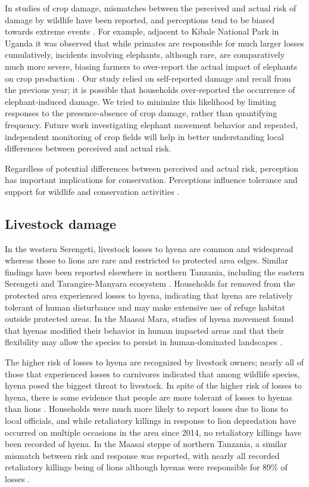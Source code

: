 \documentclass[12pt,]{article}
\begin{document}
In studies of crop damage, mismatches between the perceived and actual risk of damage by wildlife have been reported, and perceptions tend to be biased towards extreme events \citep{Gillingham2003}. For example, adjacent to Kibale National Park in Uganda it was observed that while primates are responsible for much larger losses cumulatively, incidents involving elephants, although rare, are comparatively much more severe, biasing farmers to over-report the actual impact of elephants on crop production \citep{NaughtonTreves1997}. Our study relied on self-reported damage and recall from the previous year; it is possible that households over-reported the occurrence of elephant-induced damage. We tried to minimize this likelihood by limiting responses to the presence-absence of crop damage, rather than quantifying frequency. Future work investigating elephant movement behavior and repeated, independent monitoring of crop fields will help in better understanding local differences between perceived and actual risk. 

Regardless of potential differences between perceived and actual risk, perception has important implications for conservation. Perceptions influence tolerance and support for wildlife and conservation activities \citep{Hariohay2019, Gillingham2003}. 

\subsection{Livestock damage}
In the western Serengeti, livestock losses to hyena are common and widespread whereas those to lions are rare and restricted to protected area edges. Similar findings have been reported elsewhere in northern Tanzania, including the eastern Serengeti and Tarangire-Manyara ecosystem \citep{Mkonyi2017, Mbise2018, Kissui2019}. Households far removed from the protected area experienced losses to hyena, indicating that hyena are relatively tolerant of human disturbance and may make extensive use of refuge habitat outside protected areas. In the Maasai Mara, studies of hyena movement found that hyenas modified their behavior in human impacted areas and that their flexibility may allow the species to persist in human-dominated landscapes \citep{Green2019}.

The higher risk of losses to hyena are recognized by livestock owners; nearly all of those that experienced losses to carnivores indicated that among wildlife species, hyena posed the biggest threat to livestock. In spite of the higher risk of losses to hyena, there is some evidence that people are more tolerant of losses to hyenas than lions \citep{Muriuki2017}. Households were much more likely to report losses due to lions to local officials, and while retaliatory killings in response to lion depredation have occurred on multiple occasions in the area since 2014, no retaliatory killings have been recorded of hyena. In the Maasai steppe of northern Tanzania, a similar mismatch between risk and response was reported, with nearly all recorded retaliatory killings being of lions although hyenas were responsible for 89\% of losses \citep{Kissui2019}.
\end{document}

